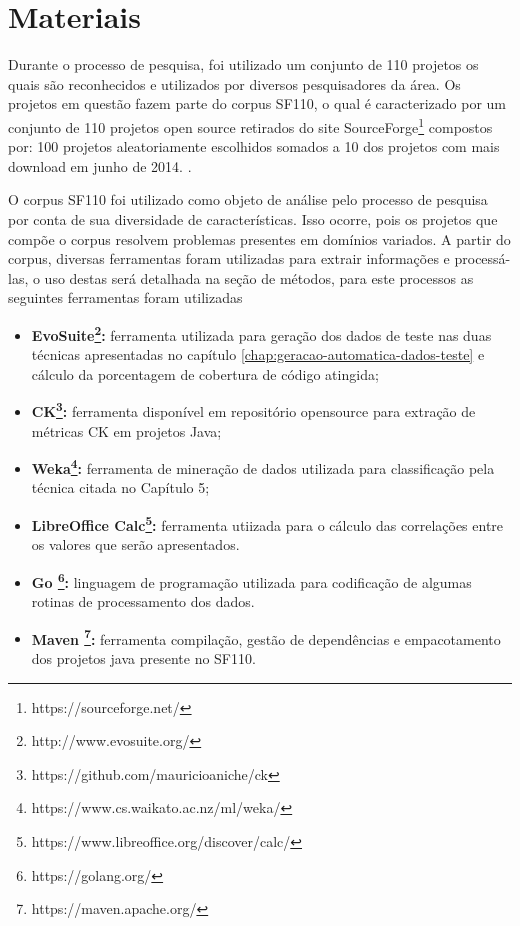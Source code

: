 \documentclass[
	12pt,				%
	oneside,			%
	a4paper,			%
	english,			%
	brazil				%
	]{abntex2ppgsi}
\begin{document}
\section{Materiais}

Durante o processo de pesquisa, foi utilizado um conjunto de 110 projetos os quais são reconhecidos e utilizados por diversos pesquisadores da área. Os projetos em questão fazem parte do corpus SF110, o qual é caracterizado por um conjunto de 110 projetos open source retirados do site SourceForge\footnote{https://sourceforge.net/} compostos por: 100 projetos aleatoriamente escolhidos somados a  10 dos projetos com mais download em junho de 2014. \cite{shamriski20151115}.

O corpus SF110 foi utilizado como objeto de análise pelo processo de pesquisa por conta de sua diversidade de características. Isso ocorre, pois os projetos que compõe o corpus resolvem problemas presentes em domínios variados.  A partir do corpus, diversas ferramentas foram utilizadas para extrair informações e processá-las, o uso destas será detalhada na seção de métodos, para este processos as seguintes ferramentas foram utilizadas 



\begin{itemize}
  \item \textbf{EvoSuite\footnote{http://www.evosuite.org/}:} ferramenta utilizada para geração dos dados de teste nas duas técnicas apresentadas no capítulo \ref{chap:geracao-automatica-dados-teste} e cálculo da porcentagem de cobertura de código atingida;
  \item \textbf{CK\footnote{https://github.com/mauricioaniche/ck}:} ferramenta disponível em repositório opensource para extração de métricas CK em projetos Java;
  \item \textbf{Weka\footnote{https://www.cs.waikato.ac.nz/ml/weka/}:} ferramenta de mineração de dados utilizada para classificação pela técnica citada no Capítulo 5;
  \item \textbf{LibreOffice Calc\footnote{https://www.libreoffice.org/discover/calc/}:} ferramenta utiizada para o cálculo das correlações entre os valores que serão apresentados.
  \item \textbf{Go \footnote{https://golang.org/}:} linguagem de programação utilizada para codificação de algumas rotinas de processamento dos dados.
  \item \textbf{Maven \footnote{https://maven.apache.org/}:} ferramenta compilação, gestão de dependências e empacotamento dos projetos java presente no SF110.
\end{itemize}
\end{document}
